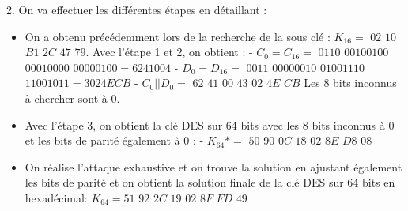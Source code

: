 \documentclass[11pt]{article}
\begin{document}
2. On va effectuer les différentes étapes en détaillant : 

\begin{itemize}

\item On a obtenu précédemment lors de la recherche de la sous clé : $K_{16}= $ $02$ $10$ $B1$ $2C$ $47$ $79$. \newline \newline
Avec l'étape 1 et 2, on obtient : \newline 
- $C_{0}=C_{16}=$ $0110$ $00100100$ $00010000$ $00000100= 6241004$ \newline 
- $D_{0}=D_{16}=$ $0011$ $00000010$ $01001110$ $11001011= 3024ECB$ \newline
- $C_{0}||D_{0}=$ $62$ $41$ $00$ $43$ $02$ $4E$ $CB$ \newline
Les 8 bits inconnus à chercher sont à $0$. \newline

\item Avec l'étape 3, on obtient la clé DES sur 64 bits avec les 8 bits inconnus à 0 et les bits de parité également à 0 : \newline
- $K_{64}*=$ $50$ $90$ $0C$ $18$ $02$ $8E$ $D8$ $08$ \newline

\item On réalise l'attaque exhaustive et on trouve la solution en ajustant également les bits de parité et on obtient la solution finale de la clé DES sur 64 bits en hexadécimal: \newline 
\color{red}
$K_{64}=51$ $92$ $2C$ $19$ $02$ $8F$ $FD$ $49$
\color{black}



\end{itemize}
\end{document}
